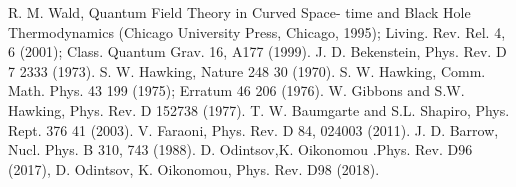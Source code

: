 \documentclass[a4paper,11pt]{article}
\begin{document}
\begin{thebibliography}{99}
R. M. Wald, Quantum Field Theory in Curved Space-
time and Black Hole Thermodynamics (Chicago University
Press, Chicago, 1995); Living. Rev. Rel. 4, 6 (2001);
Class. Quantum Grav. 16, A177 (1999).
 J. D. Bekenstein, Phys. Rev. D 7  2333 (1973).
 S. W. Hawking, Nature 248 30 (1970).
S. W. Hawking, Comm. Math. Phys. 43 199 (1975); Erratum 46 206 (1976).
W. Gibbons and S.W. Hawking, Phys. Rev. D 152738 (1977).
T. W. Baumgarte and S.L. Shapiro, Phys. Rept. 376 41 (2003).
V. Faraoni, Phys. Rev. D 84, 024003 (2011).
J. D. Barrow, Nucl. Phys. B 310, 743 (1988).
D. Odintsov,K. Oikonomou .Phys. Rev. D96 (2017),
D. Odintsov, K. Oikonomou, Phys. Rev. D98 (2018).
\end{thebibliography}
\end{document}
